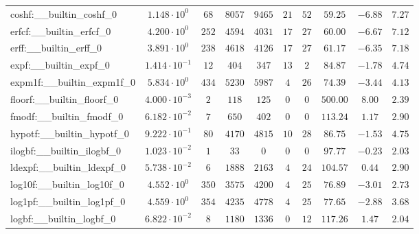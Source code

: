 \begin{tabular}{|l|c|c|c|c|c|c|c|c|c|}
coshf:\_\_builtin\_coshf\_0               & $ 1.148 \cdot 10^{0}  $ & $ 68     $ & $ 8057   $ & $ 9465   $ & $ 21  $ & $ 52  $ & $ 59.25       $ & $ -6.88   $ & $ 7.27    $ \\
erfcf:\_\_builtin\_erfcf\_0               & $ 4.200 \cdot 10^{0}  $ & $ 252    $ & $ 4594   $ & $ 4031   $ & $ 17  $ & $ 27  $ & $ 60.00       $ & $ -6.67   $ & $ 7.12    $ \\
erff:\_\_builtin\_erff\_0                 & $ 3.891 \cdot 10^{0}  $ & $ 238    $ & $ 4618   $ & $ 4126   $ & $ 17  $ & $ 27  $ & $ 61.17       $ & $ -6.35   $ & $ 7.18    $ \\
expf:\_\_builtin\_expf\_0                 & $ 1.414 \cdot 10^{-1} $ & $ 12     $ & $ 404    $ & $ 347    $ & $ 13  $ & $ 2   $ & $ 84.87       $ & $ -1.78   $ & $ 4.74    $ \\
expm1f:\_\_builtin\_expm1f\_0             & $ 5.834 \cdot 10^{0}  $ & $ 434    $ & $ 5230   $ & $ 5987   $ & $ 4   $ & $ 26  $ & $ 74.39       $ & $ -3.44   $ & $ 4.13    $ \\
floorf:\_\_builtin\_floorf\_0             & $ 4.000 \cdot 10^{-3} $ & $ 2      $ & $ 118    $ & $ 125    $ & $ 0   $ & $ 0   $ & $ 500.00      $ & $ 8.00    $ & $ 2.39    $ \\
fmodf:\_\_builtin\_fmodf\_0               & $ 6.182 \cdot 10^{-2} $ & $ 7      $ & $ 650    $ & $ 402    $ & $ 0   $ & $ 0   $ & $ 113.24      $ & $ 1.17    $ & $ 2.90    $ \\
hypotf:\_\_builtin\_hypotf\_0             & $ 9.222 \cdot 10^{-1} $ & $ 80     $ & $ 4170   $ & $ 4815   $ & $ 10  $ & $ 28  $ & $ 86.75       $ & $ -1.53   $ & $ 4.75    $ \\
ilogbf:\_\_builtin\_ilogbf\_0             & $ 1.023 \cdot 10^{-2} $ & $ 1      $ & $ 33     $ & $ 0      $ & $ 0   $ & $ 0   $ & $ 97.77       $ & $ -0.23   $ & $ 2.03    $ \\
ldexpf:\_\_builtin\_ldexpf\_0             & $ 5.738 \cdot 10^{-2} $ & $ 6      $ & $ 1888   $ & $ 2163   $ & $ 4   $ & $ 24  $ & $ 104.57      $ & $ 0.44    $ & $ 2.90    $ \\
log10f:\_\_builtin\_log10f\_0             & $ 4.552 \cdot 10^{0}  $ & $ 350    $ & $ 3575   $ & $ 4200   $ & $ 4   $ & $ 25  $ & $ 76.89       $ & $ -3.01   $ & $ 2.73    $ \\
log1pf:\_\_builtin\_log1pf\_0             & $ 4.559 \cdot 10^{0}  $ & $ 354    $ & $ 4235   $ & $ 4778   $ & $ 4   $ & $ 25  $ & $ 77.65       $ & $ -2.88   $ & $ 3.68    $ \\
logbf:\_\_builtin\_logbf\_0               & $ 6.822 \cdot 10^{-2} $ & $ 8      $ & $ 1180   $ & $ 1336   $ & $ 0   $ & $ 12  $ & $ 117.26      $ & $ 1.47    $ & $ 2.04    $ \\

\end{tabular}
